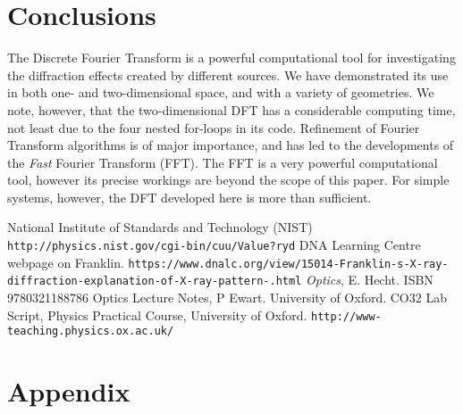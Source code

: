\documentclass[a4paper,11pt]{article}
\begin{document}
\section{Conclusions}
The Discrete Fourier Transform is a powerful computational tool for investigating the diffraction effects created by different sources. We have demonstrated its use in both one- and two-dimensional space, and with a variety of geometries. We note, however, that the two-dimensional DFT has a considerable computing time, not least due to the four nested for-loops in its code. Refinement of Fourier Transform algorithms is of major importance, and has led to the developments of the \textit{Fast} Fourier Transform (FFT). The FFT is a very powerful computational tool, however its precise workings are beyond the scope of this paper. For simple systems, however, the DFT developed here is more than sufficient.
\pagebreak
\begin{thebibliography}{9}
National Institute of Standards and Technology (NIST)
\texttt{http://physics.nist.gov/cgi-bin/cuu/Value?ryd}
DNA Learning Centre webpage on Franklin.
\texttt{https://www.dnalc.org/view/15014-Franklin-s-X-ray-diffraction-explanation-of-X-ray-pattern-.html}
\textit{Optics}, E. Hecht. ISBN 9780321188786 
Optics Lecture Notes, P Ewart. University of Oxford.
CO32 Lab Script, Physics Practical Course, University of Oxford.
\texttt{http://www-teaching.physics.ox.ac.uk/}
\end{thebibliography}

\section{Appendix}
\end{document}
